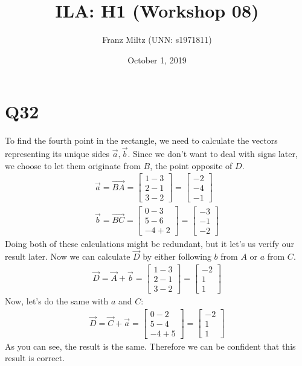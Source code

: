 \documentclass{article}
\title{ILA: H1 (Workshop 08)}
\author{Franz Miltz (UNN: s1971811)}
\date{October 1, 2019}
\begin{document}
\maketitle
\section*{Q32}
To find the fourth point in the rectangle, we need to calculate the vectors representing its unique sides $\vec a, \vec b$. Since we don't want to deal with signs later, we choose to let them originate from $B$, the point opposite of $D$.
\begin{align}
   \vec a = \vec{BA} = 
   \begin{bmatrix}
        1 - 3\\
        2 - 1\\
        3 - 2
   \end{bmatrix} =
   \begin{bmatrix}
       -2\\
       -4\\
       -1
   \end{bmatrix}\\
   \vec b = \vec{BC} =
   \begin{bmatrix}
        0 - 3\\
        5 - 6\\
        -4 + 2    
   \end{bmatrix} =
   \begin{bmatrix}
       -3\\
       -1\\
       -2
   \end{bmatrix}
\end{align}
Doing both of these calculations might be redundant, but it let's us verify our result later. Now we can calculate $\vec D$ by either following $b$ from $A$ or $a$ from $C$.
\begin{align}
    \vec D = \vec A + \vec b =
    \begin{bmatrix}
        1 - 3\\
        2 - 1\\
        3 - 2
    \end{bmatrix} =
    \begin{bmatrix}
        -2\\
        1\\
        1
    \end{bmatrix}
\end{align}
Now, let's do the same with $a$ and $C$:
\begin{align}
    \vec D = \vec C + \vec a =
    \begin{bmatrix}
        0 - 2\\
        5 - 4\\
        -4 + 5
    \end{bmatrix} =
    \begin{bmatrix}
        -2\\
        1\\
        1
    \end{bmatrix}
\end{align}
As you can see, the result is the same. Therefore we can be confident that this result is correct.
\end{document}
